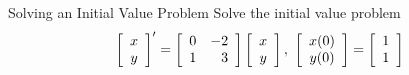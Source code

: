 \begin{example}{Solving an Initial Value Problem}{}
Solve the initial value problem
\begin{equation*}
\left[
\begin{array}{c}
x \\
y
\end{array}
\right] ^{\prime }=\left[ 
\begin{array}{rr}
0 & -2 \\
1 & 3
\end{array}
\right] \left[
\begin{array}{c}
x \\
y
\end{array}
\right] ,\ \left[
\begin{array}{c}
x(0)\\
y(0)
\end{array}
\right]  =\left[
\begin{array}{c}
1 \\
1
\end{array}
\right]
\end{equation*}
\end{example}

